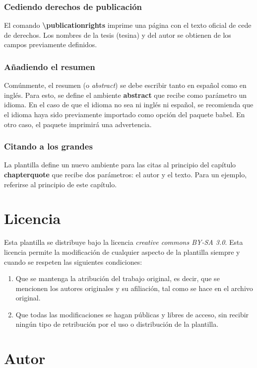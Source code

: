 \subsubsection{Cediendo derechos de publicación}
El comando \textbf{\textbackslash publicationrights} imprime una página con el texto oficial de cede de derechos. Los nombres de la tesis (tesina) y del autor se obtienen de los campos previamente definidos.

\subsubsection{Añadiendo el resumen}
Comúnmente, el resumen (o \emph{abstract}) se debe escribir tanto en español como en inglés. Para esto, se define el ambiente \textbf{abstract} que recibe como parámetro un idioma. En el caso de que el idioma no sea ni inglés ni español, se recomienda que el idioma haya sido previamente importado como opción del paquete babel. En otro caso, el paquete imprimirá una advertencia. 

\subsubsection{Citando a los grandes}
La plantilla define un nuevo ambiente para las citas al principio del capítulo \textbf{chapterquote} que recibe dos parámetros: el autor y el texto. Para un ejemplo, referirse al principio de este capítulo.


\section{Licencia}
Esta plantilla se distribuye bajo la licencia \emph{creative commons BY-SA 3.0}. Esta licencia permite la modificación de cualquier aspecto de la plantilla siempre y cuando se respeten las siguientes condiciones:
\begin{enumerate}
	\item Que se mantenga la atribución del trabajo original, es decir, que se mencionen los autores originales y su afiliación, tal como se hace en el archivo original.
	\item Que todas las modificaciones se hagan públicas y libres de acceso, sin recibir ningún tipo de retribución por el uso o distribución de la plantilla.
\end{enumerate}

\section{Autor}
